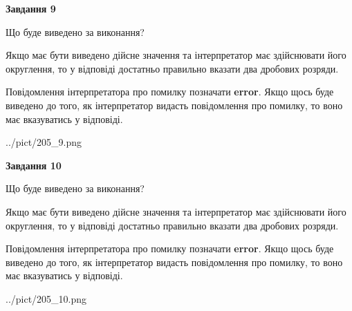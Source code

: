 \documentclass[12pt, ukrainian]{article}
\begin{document}
{\begin {Large}
{\begin {center}\textbf{Завдання 9}\end {center}}\par
Що буде виведено за виконання? \par

Якщо має бути виведено дійсне значення та інтерпретатор має здійснювати його округлення, 
то у відповіді достатньо правильно вказати два дробових розряди.

Повідомлення інтерпретатора про помилку позначати \textbf{error}.
Якщо щось буде виведено до того, як інтерпретатор видасть повідомлення про помилку, 
то воно має вказуватись у відповіді. \par

\begin{center}
	{../pict/205_9.png}
\end{center}
\newpage

{\begin {center}\textbf{Завдання 10}\end {center}}\par
Що буде виведено за виконання? \par

Якщо має бути виведено дійсне значення та інтерпретатор має здійснювати його округлення, 
то у відповіді достатньо правильно вказати два дробових розряди.

Повідомлення інтерпретатора про помилку позначати \textbf{error}.
Якщо щось буде виведено до того, як інтерпретатор видасть повідомлення про помилку, 
то воно має вказуватись у відповіді. \par

\begin{center}
	{../pict/205_10.png}
\end{center}
\newpage

\end {Large}}
\end{document}
